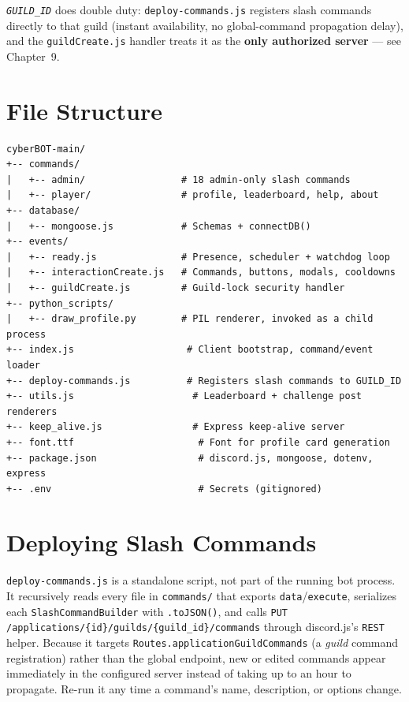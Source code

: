 \documentclass[12pt,a4paper]{report}
\newcommand{\param}[1]{\texttt{\color{cyberdark}\textit{#1}}}
\newcommand{\file}[1]{\texttt{\color{cyberpurple!80!black}#1}}
\newcommand{\note}[1]{
    \begin{tcolorbox}[colback=cyberblue!5, colframe=cyberblue,
        title=\textbf{NOTE}, fonttitle=\sffamily\small]
    #1
    \end{tcolorbox}
}
\begin{document}
\note{
    \param{GUILD\_ID} does double duty: \file{deploy-commands.js} registers slash commands
    directly to that guild (instant availability, no global-command propagation delay), and the
    \file{guildCreate.js} handler treats it as the \textbf{only authorized server} --- see
    Chapter~9.
}

\section{File Structure}

\begin{tcolorbox}[colback=codebg, colframe=cybercyan!60]
\begin{verbatim}
cyberBOT-main/
+-- commands/
|   +-- admin/                 # 18 admin-only slash commands
|   +-- player/                # profile, leaderboard, help, about
+-- database/
|   +-- mongoose.js            # Schemas + connectDB()
+-- events/
|   +-- ready.js               # Presence, scheduler + watchdog loop
|   +-- interactionCreate.js   # Commands, buttons, modals, cooldowns
|   +-- guildCreate.js         # Guild-lock security handler
+-- python_scripts/
|   +-- draw_profile.py        # PIL renderer, invoked as a child process
+-- index.js                    # Client bootstrap, command/event loader
+-- deploy-commands.js          # Registers slash commands to GUILD_ID
+-- utils.js                     # Leaderboard + challenge post renderers
+-- keep_alive.js                # Express keep-alive server
+-- font.ttf                      # Font for profile card generation
+-- package.json                  # discord.js, mongoose, dotenv, express
+-- .env                          # Secrets (gitignored)
\end{verbatim}
\end{tcolorbox}

\section{Deploying Slash Commands}

\file{deploy-commands.js} is a standalone script, not part of the running bot process. It
recursively reads every file in \file{commands/} that exports \texttt{data}/\texttt{execute},
serializes each \texttt{SlashCommandBuilder} with \texttt{.toJSON()}, and calls
\texttt{PUT /applications/\{id\}/guilds/\{guild\_id\}/commands} through discord.js's \texttt{REST}
helper. Because it targets \texttt{Routes.applicationGuildCommands} (a \emph{guild} command
registration) rather than the global endpoint, new or edited commands appear immediately in the
configured server instead of taking up to an hour to propagate. Re-run it any time a command's
name, description, or options change.
\end{document}
